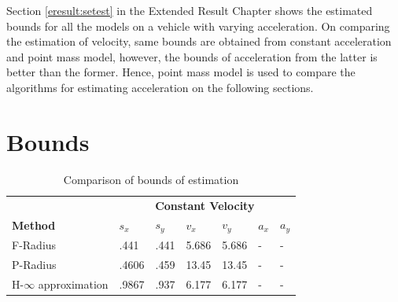 Section \ref{eresult:setest} in the Extended Result Chapter shows the estimated bounds for all the models on a vehicle with varying acceleration. On comparing the estimation of velocity, same bounds are obtained from constant acceleration and point mass model, however, the bounds of acceleration from the latter is better than the former. Hence, point mass model is used to compare the algorithms for estimating acceleration on the following sections.


\section{Bounds}
\begin{table}[htbp]
\caption{Comparison of bounds of estimation\\}
	\centering
	\renewcommand{\arraystretch}{1.1}
	\small	
	\begin{tabular}{l l l l l l l}
		\toprule 
		& \multicolumn{6}{c}{\textbf{Constant Velocity}}\\
		\textbf{Method} & \textbf{$s_x$} & \textbf{$s_y$} & \textbf{$v_x$} & \textbf{$v_y$} & \textbf{$a_x$} & \textbf{$a_y$}\\ \midrule
		F-Radius & .441 & .441 & 5.686 & 5.686 & - & -\\
		P-Radius & .4606 & .459 & 13.45 & 13.45 & - &	-\\
		H-$\infty$ approximation & .9867 &	.937 &	6.177 & 6.177 & - &-\\
		
		
		
		
%		
		

\end{tabular}
\end{table}
